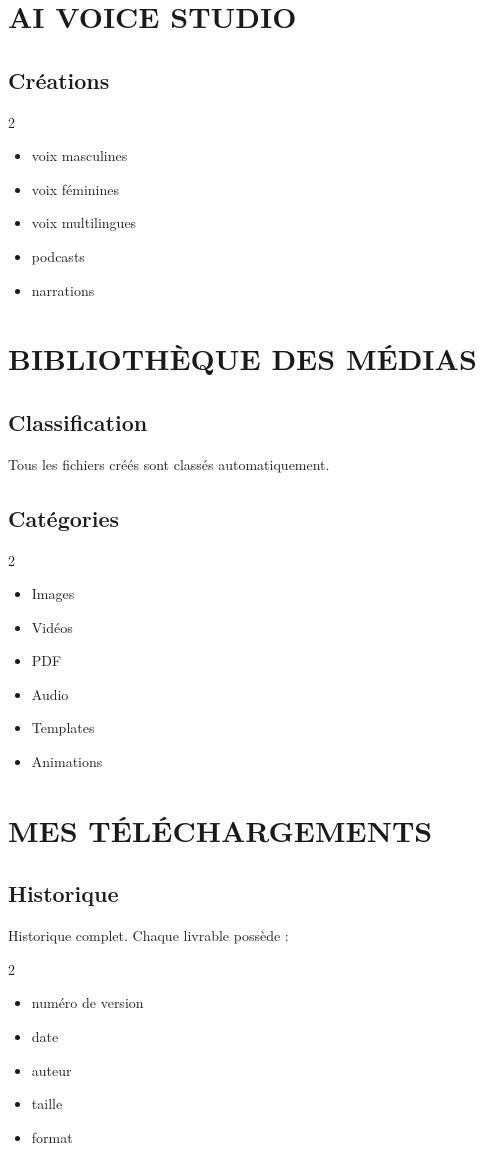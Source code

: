 \documentclass[12pt,a4paper,oneside]{book}
\begin{document}
\chapter{AI VOICE STUDIO}

\section{Créations}
\begin{multicols}{2}
\begin{itemize}
\item voix masculines
\item voix féminines
\item voix multilingues
\item podcasts
\item narrations
\end{itemize}
\end{multicols}

\chapter{BIBLIOTHÈQUE DES MÉDIAS}

\section{Classification}
Tous les fichiers créés sont classés automatiquement.

\section{Catégories}
\begin{multicols}{2}
\begin{itemize}
\item Images
\item Vidéos
\item PDF
\item Audio
\item Templates
\item Animations
\end{itemize}
\end{multicols}

\chapter{MES TÉLÉCHARGEMENTS}

\section{Historique}
Historique complet. Chaque livrable possède :
\begin{multicols}{2}
\begin{itemize}
\item numéro de version
\item date
\item auteur
\item taille
\item format
\end{itemize}
\end{multicols}
\end{document}
